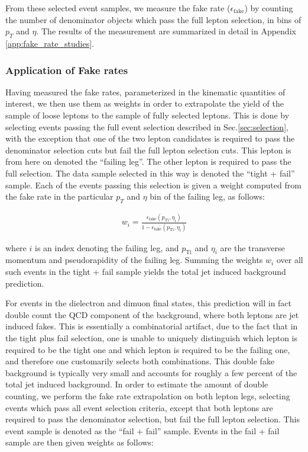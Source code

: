 From these selected event samples, we measure the fake rate 
($\epsilon_{\mathrm{fake}}$) by counting the number of denominator 
objects which pass the full lepton selection, in bins of $p_{T}$
and $\eta$. The results of the measurement are summarized in detail
in Appendix \ref{app:fake_rate_studies}.

\subsubsection{Application of Fake rates}
\label{sec:fakerateApplication}

Having measured the fake rates, parameterized in the kinematic quantities of interest,
we then use them as weights in order to extrapolate the yield of the sample of loose
leptons to the sample of fully selected leptons. This is done by selecting events
passing the full event selection described in Sec.\ref{sec:selection}, 
with the exception that one of the two lepton
candidates is required to pass the denominator selection cuts but fail the full 
lepton selection cuts. This lepton is from here on denoted the ``failing leg''. 
The other lepton is required to pass the full selection.
The data sample selected in this way is denoted the ``tight + fail'' sample.
Each of the events passing this selection is given a weight computed from
the fake rate in the particular $p_{T}$ and $\eta$ bin of the 
failing leg, as follows:

\begin{eqnarray}
  w_{i} = \frac{\epsilon_{\mathrm{fake}}(p_{\mathrm{T i}},\eta_{i})}{1 - \epsilon_{\mathrm{fake}}(p_{\mathrm{T i}},\eta_{i})}
\end{eqnarray}

where $i$ is an index denoting the failing leg, and $p_{\mathrm{T i}}$ and $\eta_{i}$
are the transverse momentum and pseudorapidity of the failing leg. 
Summing the weights $w_{i}$ over all such events in the tight + fail sample yields
the total jet induced background prediction.

For events in the dielectron and dimuon final states, this prediction will in fact 
double count the QCD component of the background, where both leptons are jet induced
fakes. This is essentially a combinatorial artifact, due to the fact that in the tight
plus fail selection, one is unable to uniquely distinguish which lepton is required to
be the tight one and which lepton is required to be the failing one, and therefore
one customarily selects both combinations. This double fake background is 
typically very small and accounts for roughly a few percent of the total jet
induced background. In order to estimate the amount of double counting,
we perform the fake rate extrapolation on both lepton legs, selecting events
which pass all event selection criteria, except that both leptons are required
to pass the denominator selection, but fail the full lepton selection. This
event sample is denoted as the ``fail + fail'' sample. Events in the fail + fail
sample are then given weights as follows:

